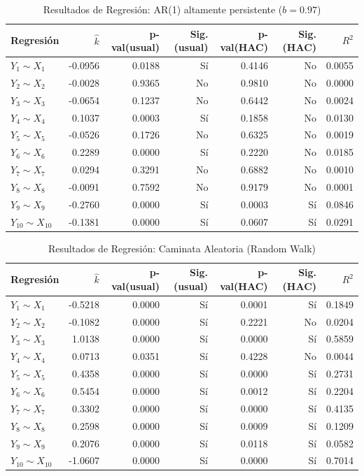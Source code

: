\documentclass[11pt,a4paper]{article}
\begin{document}
\begin{table}[H]
	\centering
	\caption{Resultados de Regresión: AR(1) altamente persistente ($b = 0.97$)}
	\label{tab:res_ii}
	\begin{tabular}{lrrrrrr}
		\toprule
		Regresión & $\hat{k}$ & p-val(usual) & Sig. (usual) & p-val(HAC) & Sig. (HAC) & $R^2$ \\
		\midrule
		$Y_1 \sim X_1$   & -0.0956 & 0.0188 & Sí  & 0.4146 & No  & 0.0055 \\
		$Y_2 \sim X_2$   & -0.0028 & 0.9365 & No  & 0.9810 & No  & 0.0000 \\
		$Y_3 \sim X_3$   & -0.0654 & 0.1237 & No  & 0.6442 & No  & 0.0024 \\
		$Y_4 \sim X_4$   & 0.1037  & 0.0003 & Sí  & 0.1858 & No  & 0.0130 \\
		$Y_5 \sim X_5$   & -0.0526 & 0.1726 & No  & 0.6325 & No  & 0.0019 \\
		$Y_6 \sim X_6$   & 0.2289  & 0.0000 & Sí  & 0.2220 & No  & 0.0185 \\
		$Y_7 \sim X_7$   & 0.0294  & 0.3291 & No  & 0.6882 & No  & 0.0010 \\
		$Y_8 \sim X_8$   & -0.0091 & 0.7592 & No  & 0.9179 & No  & 0.0001 \\
		$Y_9 \sim X_9$   & -0.2760 & 0.0000 & Sí  & 0.0003 & Sí  & 0.0846 \\
		$Y_{10} \sim X_{10}$ & -0.1381 & 0.0000 & Sí  & 0.0607 & Sí  & 0.0291 \\
		\bottomrule
	\end{tabular}
\end{table}
\begin{table}[H]
	\centering
	\caption{Resultados de Regresión: Caminata Aleatoria (Random Walk)}
	\label{tab:res_iii}
	\begin{tabular}{lrrrrrr}
		\toprule
		Regresión & $\hat{k}$ & p-val(usual) & Sig.(usual) & p-val(HAC) & Sig. (HAC) & $R^2$ \\
		\midrule
		$Y_1 \sim X_1$   & -0.5218 & 0.0000 & Sí  & 0.0001 & Sí  & 0.1849 \\
		$Y_2 \sim X_2$   & -0.1082 & 0.0000 & Sí  & 0.2221 & No  & 0.0204 \\
		$Y_3 \sim X_3$   & 1.0138  & 0.0000 & Sí  & 0.0000 & Sí  & 0.5859 \\
		$Y_4 \sim X_4$   & 0.0713  & 0.0351 & Sí  & 0.4228 & No  & 0.0044 \\
		$Y_5 \sim X_5$   & 0.4358  & 0.0000 & Sí  & 0.0000 & Sí  & 0.2731 \\
		$Y_6 \sim X_6$   & 0.5454  & 0.0000 & Sí  & 0.0012 & Sí  & 0.2204 \\
		$Y_7 \sim X_7$   & 0.3302  & 0.0000 & Sí  & 0.0000 & Sí  & 0.4135 \\
		$Y_8 \sim X_8$   & 0.2598  & 0.0000 & Sí  & 0.0009 & Sí  & 0.1209 \\
		$Y_9 \sim X_9$   & 0.2076  & 0.0000 & Sí  & 0.0118 & Sí  & 0.0582 \\
		$Y_{10} \sim X_{10}$ & -1.0607 & 0.0000 & Sí  & 0.0000 & Sí  & 0.7014 \\
		\bottomrule
	\end{tabular}
\end{table}
\end{document}
